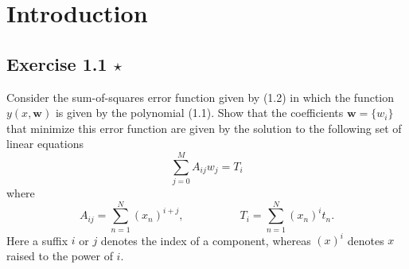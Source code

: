 \chapter{Introduction}

\section*{Exercise 1.1 $\star$}
Consider the sum-of-squares error function given by (1.2) in 
which the function $y(x, \mathbf{w})$ is given by the polynomial
(1.1). Show that the coefficients $\mathbf{w} = \{ w_i \}$ that minimize
this error function are given by the solution to the following
set of linear equations
\begin{equation}\label{eq:1.122}\tag{1.122}
    \sum_{j=0}^{M} A_{ij}w_j = T_i
\end{equation}
where 
\begin{equation}\label{eq:1.123}\tag{1.123}
    A_{ij} = \sum_{n=1}^{N} (x_n)^{i + j}, \hspace{5em} T_i = \sum_{n=1}^{N} (x_n)^it_n.
\end{equation}
Here a suffix $i$ or $j$ denotes the index of a component, whereas
$(x)^i$ denotes $x$ raised to the power of $i$.

\vspace{1em}

